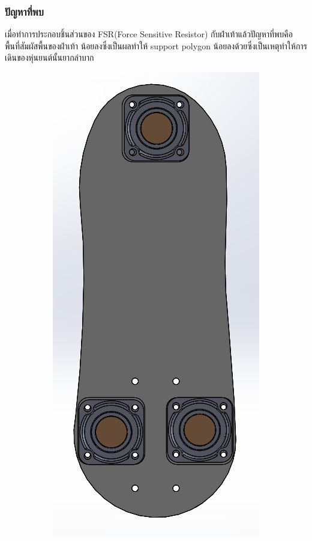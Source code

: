 \subsubsection*{ปัญหาที่พบ}
เมื่อทำการประกอบชิ้นส่วนของ FSR(Force Sensitive Resistor) กับฝ่าเท้าแล้วปัญหาที่พบคือ พื้นที่สัมผัสพื้นของฝ่าเท้า
น้อยลงซึ่งเป็นผลทำให้ support polygon น้อยลงด้วยซึ่งเป็นเหตุทำให้การเดินของหุ่นยนต์นั้นยากลำบาก
\begin{figure}[h!]
  \centering
  \begin{subfigure}[b]{0.3\linewidth}
    \includegraphics[width=\linewidth]{chapter4/images/foot+FSR.PNG}

\end{subfigure}
\end{figure}
